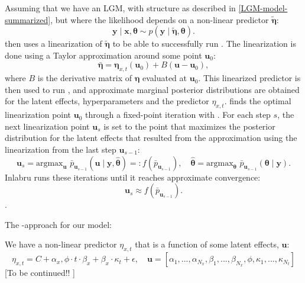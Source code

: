 Assuming that we have an LGM, with structure as described in \ref{LGM-model-summarized}, but where the likelihood depends on a non-linear predictor $\tilde{\boldsymbol{\eta}}$:
\begin{equation}
    \textbf{y}\mid\textbf{x},\boldsymbol{\theta} \sim p(\textbf{y}\mid \tilde{\boldsymbol{\eta}}, \boldsymbol{\theta}).
    \label{Eq:non-linear-predictor}
\end{equation}
\inlabru then uses a linearization of $\tilde{\boldsymbol{\eta}}$ to be able to successfully run \inla. The linearization is done using a Taylor approximation around some point $\textbf{u}_0$:
\begin{equation}
    \bar{\boldsymbol{\eta}} = \boldsymbol{\eta}_{x,t}(\textbf{u}_0) + B(\textbf{u} - \textbf{u}_0),
\end{equation}
where $B$ is the derivative matrix of $\boldsymbol{\eta}$ evaluated at $\textbf{u}_0$. This linearized predictor is then used to run \inla, and approximate marginal posterior distributions are obtained for the latent effects, hyperparameters and the predictor $\eta_{x,t}$. 
\inlabru finds the optimal linearization point $\textbf{u}_0$ through a fixed-point iteration with \inla. For each step $s$, the next linearization point $\textbf{u}_s$ is set to the point that maximizes the posterior distribution for the latent effects that resulted from the \inla approximation using the linearization from the last step $\textbf{u}_{s-1}$:
\begin{equation}
\textbf{u}_{s} = \text{argmax}_{\textbf{u}}\,\,\bar{p}_{\textbf{u}_{s-1}}(\textbf{u}\mid \textbf{y}, \hat{\boldsymbol{\theta}}) =: f(\bar{p}_{\textbf{u}_{s-1}}), \quad \hat{\boldsymbol{\theta}} = \text{argmax}_{\boldsymbol{\theta}}\,\,\bar{p}_{\textbf{u}_{s-1}}(\boldsymbol{\theta}\mid \textbf{y}).
\end{equation}
Inlabru runs these iterations until it reaches approximate convergence:
\begin{equation}
\textbf{u}_s \approx f(\bar{p}_{\textbf{u}_{s-1}}).
\end{equation}\cite{Inlabru}.

The \inlabru-approach for our model:

We have a non-linear predictor $\eta_{x,t}$ that is a function of some latent effects, $\textbf{u}$:
\begin{equation}
    \eta_{x,t} = C + \alpha_x, \phi\cdot t\cdot \beta_x + \beta_x\cdot\kappa_t + \epsilon, \quad \textbf{u} = [\alpha_1,...,\alpha_{N_x},\beta_1,...,\beta_{N_x},\phi,\kappa_1,...,\kappa_{N_t}]
\end{equation}
[To be continued!! ]
